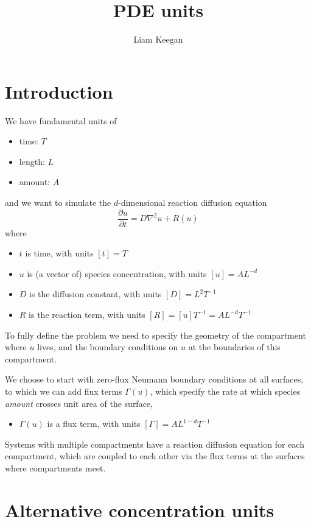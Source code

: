\documentclass{article}
\title{PDE units}
\author{Liam Keegan}
\begin{document}
\maketitle

\section{Introduction}

We have fundamental units of
\begin{itemize}
    \item time: $T$
    \item length: $L$
    \item amount: $A$
\end{itemize}
and we want to simulate the $d$-dimensional reaction diffusion equation
\begin{equation}
\label{eq:reacdiff}
    \frac{\partial u}{\partial t} = D \nabla^2 u + R(u)
\end{equation}
where
\begin{itemize}
    \item $t$ is time, with units $[t] = T$
    \item $u$ is (a vector of) species concentration, with units $[u] = A L^{-d}$
    \item $D$ is the diffusion constant, with units $[D] = L^2 T^{-1}$
    \item $R$ is the reaction term, with units $[R] = [u] T^{-1} = A L^{-d} T^{-1}$
\end{itemize}

To fully define the problem we need to specify the geometry of the compartment where $u$ lives,
and the boundary conditions on $u$ at the boundaries of this compartment.

We choose to start with zero-flux Neumann boundary conditions at all surfaces, to which we can add flux terms $\Gamma(u)$,
which specify the rate at which species \emph{amount} crosses unit area of the surface,
\begin{itemize}
    \item $\Gamma(u)$ is a flux term, with units $[\Gamma] = A L^{1-d} T^{-1}$
\end{itemize}

Systems with multiple compartments have a reaction diffusion equation for each compartment,
which are coupled to each other via the flux terms at the surfaces where compartments meet.

\section{Alternative concentration units}
\end{document}
